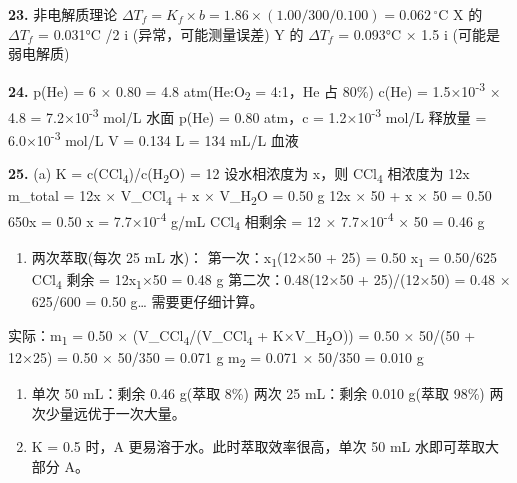 \textbf{23.} 非电解质理论 \(\Delta T_f = K_f \times b = 1.86 \times (1.00/300/0.100) = 0.062\,^\circ\mathrm{C}\)
X 的 \(\Delta T_f\) = 0.031°C /2 \箭 i (异常，可能测量误差)
Y 的 \(\Delta T_f\) = 0.093°C  × 1.5 \箭 i (可能是弱电解质)

\textbf{24.} p(He) = 6 × 0.80 = 4.8 atm(He:O\textsubscript{2} = 4:1，He 占 80\%)
c(He) = 1.5×10\textsuperscript{-3} × 4.8 = 7.2×10\textsuperscript{-3} mol/L
水面 p(He) = 0.80 atm，c = 1.2×10\textsuperscript{-3} mol/L
释放量 = 6.0×10\textsuperscript{-3} mol/L \箭 V = 0.134 L = 134 mL/L 血液

\textbf{25.}
(a) K = c(CCl\textsubscript{4})/c(H\textsubscript{2}O) = 12
设水相浓度为 x，则 CCl\textsubscript{4} 相浓度为 12x
m\_total = 12x × V\_CCl\textsubscript{4} + x × V\_H\textsubscript{2}O = 0.50 g
12x × 50 + x × 50 = 0.50 \箭 650x = 0.50 \箭 x = 7.7×10\textsuperscript{-4} g/mL
CCl\textsubscript{4} 相剩余 = 12 × 7.7×10\textsuperscript{-4} × 50 = 0.46 g

\begin{enumerate}
\def\labelenumi{(\alph{enumi})}
\setcounter{enumi}{1}
\tightlist
\item
  两次萃取(每次 25 mL 水)：
  第一次：x\textsubscript{1}(12×50 + 25) = 0.50 \箭 x\textsubscript{1} = 0.50/625 \箭 CCl\textsubscript{4} 剩余 = 12x\textsubscript{1}×50 = 0.48 g
  第二次：0.48(12×50 + 25)/(12×50) = 0.48 × 625/600 = 0.50 g\ldots{} 需要更仔细计算。
\end{enumerate}

实际：m\textsubscript{1} = 0.50 × (V\_CCl\textsubscript{4}/(V\_CCl\textsubscript{4} + K×V\_H\textsubscript{2}O)) = 0.50 × 50/(50 + 12×25) = 0.50 × 50/350 = 0.071 g
m\textsubscript{2} = 0.071 × 50/350 = 0.010 g

\begin{enumerate}
\def\labelenumi{(\alph{enumi})}
\setcounter{enumi}{2}
\item
  单次 50 mL：剩余 0.46 g(萃取 8\%)
  两次 25 mL：剩余 0.010 g(萃取 98\%)
  两次少量远优于一次大量。
\item
  K = 0.5 时，A 更易溶于水。此时萃取效率很高，单次 50 mL 水即可萃取大部分 A。
\end{enumerate}
